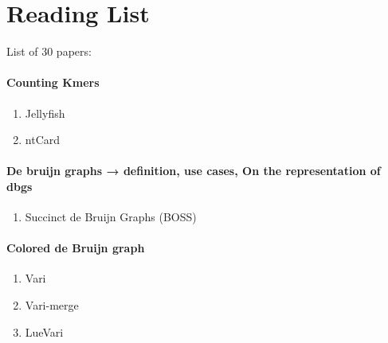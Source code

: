 
\chapter{Reading List}
\label{chap:readingList}

List of 30 papers:
\subsubsection{Counting Kmers}
\begin{enumerate}
    \item Jellyfish
    \item ntCard
\end{enumerate}
\subsubsection{De bruijn graphs → definition, use cases, On the representation of dbgs}
\begin{enumerate}
    \item Succinct de Bruijn Graphs (BOSS)
\end{enumerate}
\subsubsection{Colored de Bruijn graph}
\begin{enumerate}
    \item Vari
    \item Vari-merge
    \item LueVari
\end{enumerate}
